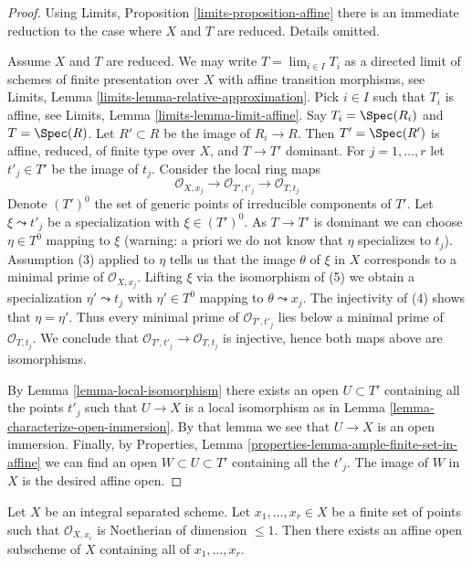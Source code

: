 \begin{proof}
Using Limits, Proposition \ref{limits-proposition-affine}
there is an immediate reduction to the case where $X$ and $T$ are reduced.
Details omitted.

\medskip\noindent
Assume $X$ and $T$ are reduced. We may write $T = \lim_{i \in I} T_i$
as a directed limit of schemes of finite presentation over $X$
with affine transition morphisms, see
Limits, Lemma \ref{limits-lemma-relative-approximation}.
Pick $i \in I$ such that $T_i$ is affine, see
Limits, Lemma \ref{limits-lemma-limit-affine}.
Say $T_i = \Spec(R_i)$ and $T = \Spec(R)$.
Let $R' \subset R$ be the image of $R_i \to R$.
Then $T' = \Spec(R')$ is affine, reduced, of finite type over $X$,
and $T \to T'$ dominant. For $j = 1, \ldots, r$ let $t'_j \in T'$
be the image of $t_j$. Consider the local ring maps
$$
\mathcal{O}_{X, x_j} \to
\mathcal{O}_{T', t'_j} \to
\mathcal{O}_{T, t_j}
$$
Denote $(T')^0$ the set of generic points of irreducible
components of $T'$. Let $\xi \leadsto t'_j$ be a specialization with
$\xi \in (T')^0$. As $T \to T'$ is dominant we can choose $\eta \in T^0$ 
mapping to $\xi$ (warning: a priori we do not know that $\eta$ specializes
to $t_j$). Assumption (3) applied to $\eta$ tells us that the image $\theta$
of $\xi$ in $X$ corresponds to a minimal prime of $\mathcal{O}_{X, x_j}$.
Lifting $\xi$ via the isomorphism of (5) we obtain a specialization
$\eta' \leadsto t_j$ with $\eta' \in T^0$ mapping to $\theta \leadsto x_j$.
The injectivity of (4) shows that $\eta = \eta'$. Thus
every minimal prime of $\mathcal{O}_{T', t'_j}$ lies below
a minimal prime of $\mathcal{O}_{T, t_j}$. We conclude that
$\mathcal{O}_{T', t'_j} \to \mathcal{O}_{T, t_j}$ is injective,
hence both maps above are isomorphisms.

\medskip\noindent
By Lemma \ref{lemma-local-isomorphism} there exists an open
$U \subset T'$ containing all the points $t'_j$ such that
$U \to X$ is a local isomorphism as in
Lemma \ref{lemma-characterize-open-immersion}.
By that lemma we see that $U \to X$ is an open immersion.
Finally, by
Properties, Lemma \ref{properties-lemma-ample-finite-set-in-affine}
we can find an open $W \subset U \subset T'$
containing all the $t'_j$. The image of $W$ in $X$ is the
desired affine open.
\end{proof}

\begin{lemma}
\label{lemma-finite-set-codim-1-points-in-affine}
Let $X$ be an integral separated scheme. Let $x_1, \ldots, x_r \in X$
be a finite set of points such that $\mathcal{O}_{X, x_i}$
is Noetherian of dimension $\leq 1$. Then there exists an affine
open subscheme of $X$ containing all of $x_1, \ldots, x_r$.
\end{lemma}

